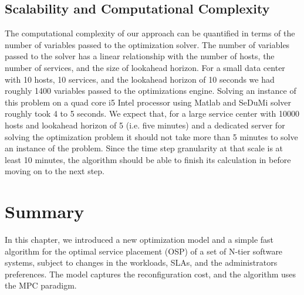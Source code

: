 
\subsection{Scalability and Computational Complexity} 
  The computational complexity of our approach can be quantified in terms of the number of variables passed to the optimization solver. The number of variables passed to the solver has a linear relationship with the number of hosts, the number of services, and the size of lookahead horizon. For a small data center with 10 hosts, 10 services, and the lookahead horizon of 10 seconds we had roughly 1400 variables passed to the optimizations engine. Solving an instance of this problem on a quad core i5 Intel processor using Matlab and SeDuMi solver roughly took 4 to 5 seconds. 
We expect that, for a large service center with 10000 hosts and lookahead horizon of 5 (i.e. five minutes) and a dedicated server for solving the optimization problem it should not take more than 5 minutes to solve an instance of the problem. Since the time step granularity at that scale is at least 10 minutes, the algorithm should be able to finish its calculation in before moving on to the next step. 


\section{Summary}  
	\label{sec:conclusion-future-work}
In this chapter, we introduced a new optimization model and a simple fast algorithm for the optimal service placement (OSP) of a set of N-tier software systems, subject to changes in the workloads, SLAs, and the administrators preferences. The model captures the reconfiguration cost, and the algorithm uses the MPC paradigm. 
	
